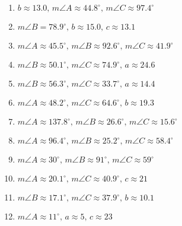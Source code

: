 \begin{enumerate}
	\item $b \approx 13.0, \, m\angle A \approx 44.8^\circ, \, m\angle C \approx 97.4^\circ$
	\item $m \angle B = 78.9^\circ, \, b \approx 15.0, \, c \approx 13.1$
	\item $m\angle A \approx 45.5^\circ, \, m\angle B \approx 92.6^\circ, \, m\angle C \approx 41.9^\circ$
	
	\item $m\angle B \approx 50.1^\circ, \, m\angle C \approx 74.9^\circ, \, a \approx 24.6$
	\item $m\angle B \approx 56.3^\circ, \, m\angle C \approx 33.7^\circ, \, a \approx 14.4$
	\item $m\angle A \approx 48.2^\circ, \, m\angle C \approx 64.6^\circ, \, b \approx 19.3$
	\item $m\angle A \approx 137.8^\circ, \, m\angle B \approx 26.6^\circ, \, m\angle C \approx 15.6^\circ$
	\item $m\angle A \approx 96.4^\circ, \, m\angle B \approx 25.2^\circ, \, m\angle C \approx 58.4^\circ$
	\item $m\angle A \approx 30^\circ, \, m\angle B \approx 91^\circ, \, m\angle C \approx 59^\circ$
	\item $m\angle A \approx 20.1^\circ, \, m\angle C \approx 40.9^\circ, \, c \approx 21$
	\item $m\angle B \approx 17.1^\circ, \, m\angle C \approx 37.9^\circ, \, b \approx 10.1$
	\item $m\angle A \approx 11^\circ, \, a \approx 5, \, c \approx 23$
\end{enumerate}